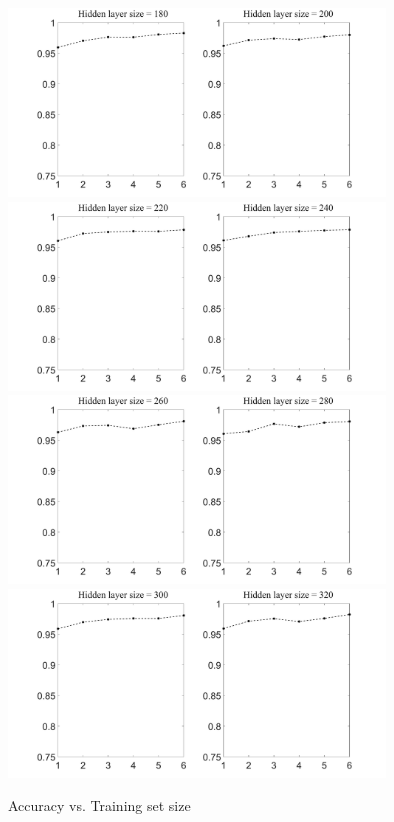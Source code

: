 \documentclass[conference]{IEEEtran}
\begin{document}
\begin{subfigures}
\begin{figure}[tmbh]
\centering
\includegraphics[width=10cm]{AccuracyTSSizeE.pdf}
\includegraphics[width=10cm]{AccuracyTSSizeF.pdf}
\includegraphics[width=10cm]{AccuracyTSSizeG.pdf}
\includegraphics[width=10cm]{AccuracyTSSizeH.pdf}
\caption{Accuracy vs. Training set size}
\label{figure:ATSS_B}
\end{figure}


\end{subfigures}
\end{document}

